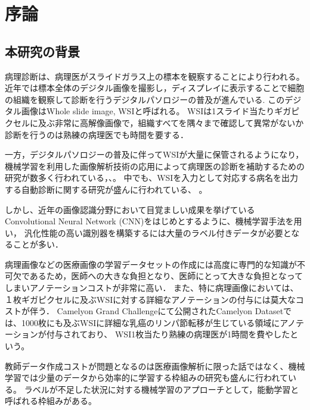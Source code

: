 \chapter{序論}

\section{本研究の背景}

病理診断は、病理医がスライドガラス上の標本を観察することにより行われる。
近年では標本全体のデジタル画像を撮影し，ディスプレイに表示することで細胞の組織を観察して診断を行うデジタルパソロジーの普及が進んでいる\cite{pantanowitz2010digital}.
このデジタル画像はWhole slide image, WSIと呼ばれる。
WSIは1スライド当たりギガピクセルに及ぶ非常に高解像画像で，組織すべてを隅々まで確認して異常がないか診断を行うのは熟練の病理医でも時間を要する．

一方，デジタルパソロジーの普及に伴ってWSIが大量に保管されるようになり，機械学習を利用した画像解析技術の応用によって病理医の診断を補助するための研究が数多く行われている\cite{gurcan2009histopathological}，\cite{komuraishikawa}、\cite{litjens2017survey}。
中でも、WSIを入力として対応する病名を出力する自動診断に関する研究が盛んに行われている\cite{doyle2008automated}、 \cite{dundar2011computerized}。

しかし、近年の画像認識分野において目覚ましい成果を挙げているConvolutional Neural Network (CNN)をはじめとするように、機械学習手法を用い，
汎化性能の高い識別器を構築するには大量のラベル付きデータが必要となることが多い．

病理画像などの医療画像の学習データセットの作成には高度に専門的な知識が不可欠であるため，医師への大きな負担となり、医師にとって大きな負担となってしまいアノテーションコストが非常に高い．
また、特に病理画像においては、１枚ギガピクセルに及ぶWSIに対する詳細なアノテーションの付与には莫大なコストが伴う．
Camelyon Grand Challenge\cite{Camelyon17}にて公開されたCamelyon Datasetでは、1000枚にも及ぶWSIに詳細な乳癌のリンパ節転移が生じている領域にアノテーションが付与されており、
WSI1枚当たり熟練の病理医が1時間を費やしたという。

教師データ作成コストが問題となるのは医療画像解析に限った話ではなく、機械学習では少量のデータから効率的に学習する枠組みの研究も盛んに行われている。
ラベルが不足した状況に対する機械学習のアプローチとして，能動学習と呼ばれる枠組みがある。

